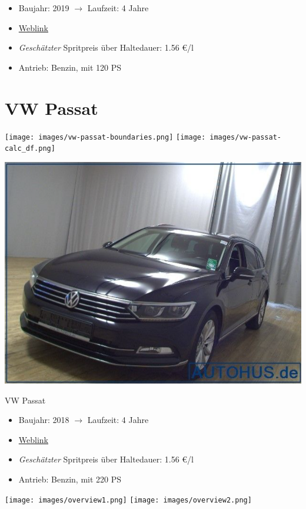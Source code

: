\documentclass[landscape, DIV=99, 14pt]{scrartcl}
\begin{document}
\begin{itemize}
    \item Baujahr: 2019 $\rightarrow$ Laufzeit: 4 Jahre
    \item \href{https://suchen.mobile.de/fahrzeuge/details.html?id=333199596}{Weblink}
    \item \emph{Gesch\"atzter} Spritpreis \"uber Haltedauer: 1.56 \euro{}/l
    \item Antrieb: Benzin, mit 120 PS
\end{itemize}

\pagebreak


\twocolumn

\section*{VW Passat}
\begin{center}
\texttt{[image: images/vw-passat-boundaries.png]}
\null
\vspace{0.5cm}
\texttt{[image: images/vw-passat-calc\_df.png]}
\end{center}

\pagebreak
\null
\vspace{2cm}
\begin{center}
\includegraphics[width=0.9\columnwidth]{cars/vw-passat.png}

VW Passat
\end{center}

\begin{itemize}
    \item Baujahr: 2018 $\rightarrow$ Laufzeit: 4 Jahre
    \item \href{https://www.autohus.de/autosuche/details/260323/vw-passat-var-2-0-tsi/}{Weblink}
    \item \emph{Gesch\"atzter} Spritpreis \"uber Haltedauer: 1.56 \euro{}/l
    \item Antrieb: Benzin, mit 220 PS
\end{itemize}

\pagebreak



\pagebreak

\onecolumn
\null
\vfill 
\begin{center}
\texttt{[image: images/overview1.png]}
\null
\vspace{0.5cm}
\texttt{[image: images/overview2.png]}
\end{center}
\vfill 
\end{document}
